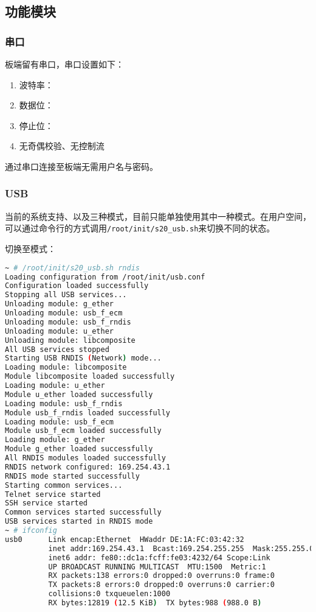 \documentclass[UTF8]{ctexart}
\newcommand{\code}[1]{\colorbox{gray!10}{\lstinline[style=inlinecode]|#1|}}
\begin{document}
\subsection{功能模块}

\subsubsection{串口}

板端留有串口，串口设置如下：

\begin{enumerate}
    \item 波特率：
    \item 数据位：
    \item 停止位：
    \item 无奇偶校验、无控制流
\end{enumerate}

通过串口连接至板端无需用户名与密码。

\subsubsection{USB}

当前的系统支持、以及三种模式，目前只能单独使用其中一种模式。在用户空间，可以通过命令行的方式调用\code{/root/init/s20_usb.sh}来切换不同的状态。

切换至模式：

\begin{lstlisting}[language=sh]
~ # /root/init/s20_usb.sh rndis
Loading configuration from /root/init/usb.conf
Configuration loaded successfully
Stopping all USB services...
Unloading module: g_ether
Unloading module: usb_f_ecm
Unloading module: usb_f_rndis
Unloading module: u_ether
Unloading module: libcomposite
All USB services stopped
Starting USB RNDIS (Network) mode...
Loading module: libcomposite
Module libcomposite loaded successfully
Loading module: u_ether
Module u_ether loaded successfully
Loading module: usb_f_rndis
Module usb_f_rndis loaded successfully
Loading module: usb_f_ecm
Module usb_f_ecm loaded successfully
Loading module: g_ether
Module g_ether loaded successfully
All RNDIS modules loaded successfully
RNDIS network configured: 169.254.43.1
RNDIS mode started successfully
Starting common services...
Telnet service started
SSH service started
Common services started successfully
USB services started in RNDIS mode    
~ # ifconfig 
usb0      Link encap:Ethernet  HWaddr DE:1A:FC:03:42:32  
          inet addr:169.254.43.1  Bcast:169.254.255.255  Mask:255.255.0.0
          inet6 addr: fe80::dc1a:fcff:fe03:4232/64 Scope:Link
          UP BROADCAST RUNNING MULTICAST  MTU:1500  Metric:1
          RX packets:138 errors:0 dropped:0 overruns:0 frame:0
          TX packets:8 errors:0 dropped:0 overruns:0 carrier:0
          collisions:0 txqueuelen:1000 
          RX bytes:12819 (12.5 KiB)  TX bytes:988 (988.0 B)
\end{lstlisting}
\end{document}
